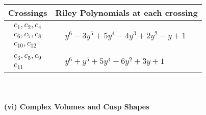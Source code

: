 \documentclass[1p]{elsarticle_modified}
\theoremstyle{definition}
\begin{document}
\begin{tabular}{m{50pt}|m{274pt}}
Crossings & \hspace{64pt}Riley Polynomials at each crossing \\
\hline $$\begin{aligned}c_{1},c_{2},c_{4}\\c_{6},c_{7},c_{8}\\c_{10},c_{12}\end{aligned}$$&$\begin{aligned}
&y^6-3 y^5+5 y^4-4 y^3+2 y^2- y+1
\end{aligned}$\\
\hline $$\begin{aligned}c_{3},c_{5},c_{9}\\c_{11}\end{aligned}$$&$\begin{aligned}
&y^6+y^5+5 y^4+6 y^2+3 y+1
\end{aligned}$\\
\hline
\end{tabular}\\~\\
\newpage\flushleft \textbf{(vi) Complex Volumes and Cusp Shapes}
\end{document}
